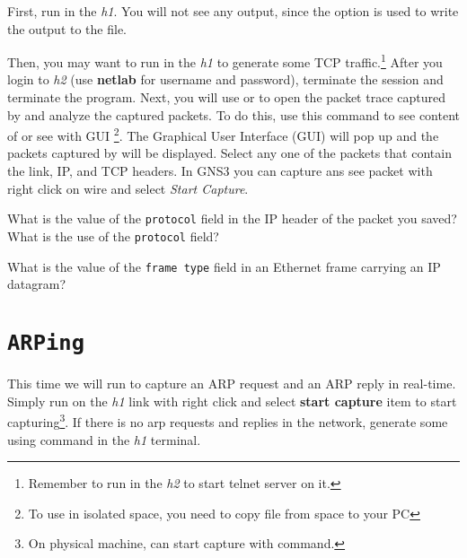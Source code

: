\documentclass{../UTNetLab}
\begin{document}
First, run  in the \textit{h1}.
You will not see any  output, since the  option is used to write the output to the  file.

Then, you may want to run  in the \textit{h1} to generate some TCP traffic.\footnote{Remember to run  in the \textit{h2} to start telnet server on it.}
After you login to \textit{h2} (use \textbf{netlab} for username and password), terminate the  session and terminate the  program.
Next, you will use  or  to open the packet trace captured by  and analyze the captured packets.
To do this, use this command  to see content of  or see with GUI \footnote{To use  in isolated  space, you need to copy file from   space to your PC}.
The  Graphical User Interface (GUI) will pop up and the packets captured by  will be displayed.
Select any one of the packets that contain the link, IP, and TCP headers.
In GNS3 you can capture ans see packet with right click on wire and select \textit{Start Capture}.

\begin{report}
    \item What is the value of the \texttt{protocol} field in the IP header of the packet you saved?
    What is the use of the \texttt{protocol} field?

    \item What is the value of the \texttt{frame type} field in an Ethernet frame carrying an IP datagram?
\end{report}

\section{\texttt{ARPing}}
This time we will run  to capture an ARP request and an ARP reply in real-time.
Simply run  on the \textit{h1} link with right click and select \textbf{start capture} item to start capturing\footnote{On physical machine, can start capture with  command.}.
If there is no arp requests and replies in the network, generate some using  command in the \textit{h1} terminal.
\end{document}
